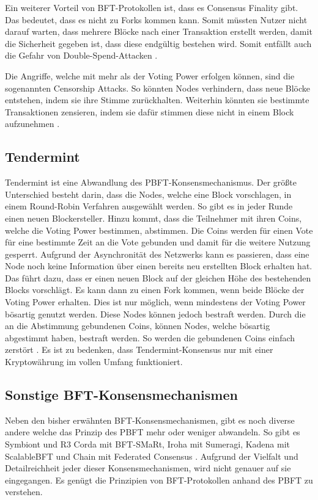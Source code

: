 Ein weiterer Vorteil von BFT-Protokollen ist, dass es Consensus Finality gibt. Das bedeutet, dass es nicht zu Forks kommen kann. Somit müssten Nutzer nicht darauf warten, dass mehrere Blöcke nach einer Transaktion erstellt werden, damit die Sicherheit gegeben ist, dass diese endgültig bestehen wird. Somit entfällt auch die Gefahr von Double-Spend-Attacken \cite{Vukolicquestscalableblockchain2015}.

Die Angriffe, welche mit mehr als  der Voting Power erfolgen können, sind die sogenannten Censorship Attacks. So könnten Nodes verhindern, dass neue Blöcke entstehen, indem sie ihre Stimme zurückhalten. Weiterhin könnten sie bestimmte Transaktionen zensieren, indem sie dafür stimmen diese nicht in einem Block aufzunehmen \cite{TendermintTeamTendermintGithubRepository2018}.

\subsection{Tendermint}
Tendermint ist eine Abwandlung des PBFT-Konsensmechanismus. Der größte Unterschied besteht darin, dass die Nodes, welche eine Block vorschlagen, in einem Round-Robin Verfahren ausgewählt werden. So gibt es in jeder Runde einen neuen Blockersteller. Hinzu kommt, dass die Teilnehmer mit ihren Coins, welche die Voting Power bestimmen, abstimmen. Die Coins werden für einen Vote für eine bestimmte Zeit an die Vote gebunden und damit für die weitere Nutzung gesperrt. Aufgrund der Asynchronität des Netzwerks kann es passieren, dass eine Node noch keine Information über einen bereits neu erstellten Block erhalten hat. Das führt dazu, dass er einen neuen Block auf der gleichen Höhe des bestehenden Blocks vorschlägt. Es kann dann zu einen Fork kommen, wenn beide Blöcke  der Voting Power erhalten. Dies ist nur möglich, wenn mindestens  der Voting Power bösartig genutzt werden. Diese Nodes können jedoch bestraft werden. Durch die an die Abstimmung gebundenen Coins, können Nodes, welche bösartig abgestimmt haben, bestraft werden. So werden die gebundenen Coins einfach zerstört \cite{KwonTendermintConsensusmining2014}\cite{BuchmanTendermintByzantineFault2016}. Es ist zu bedenken, dass Tendermint-Konsensus nur mit einer Kryptowährung im vollen Umfang funktioniert.

\subsection{Sonstige BFT-Konsensmechanismen}
Neben den bisher erwähnten BFT-Konsensmechanismen, gibt es noch diverse andere welche das Prinzip des PBFT mehr oder weniger abwandeln. So gibt es Symbiont und R3 Corda mit BFT-SMaRt, Iroha mit Sumeragi, Kadena mit ScalableBFT und Chain mit Federated Consensus \cite{CachinBlockchainConsensusProtocols2017}. Aufgrund der Vielfalt und Detailreichheit jeder dieser Konsensmechanismen, wird nicht genauer auf sie eingegangen. Es genügt die Prinzipien von BFT-Protokollen anhand des PBFT zu verstehen.

